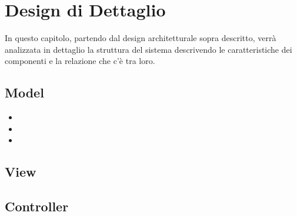 \chapter{Design di Dettaglio}
In questo capitolo, partendo dal design architetturale sopra descritto, verrà analizzata in dettaglio la struttura del sistema descrivendo le caratteristiche dei componenti e la relazione che c'è tra loro.

    \section{Model}
        \begin{itemize}
            \item 
            \item 
            \item 
        \end{itemize}
    \section{View}
    
    \section{Controller}
    